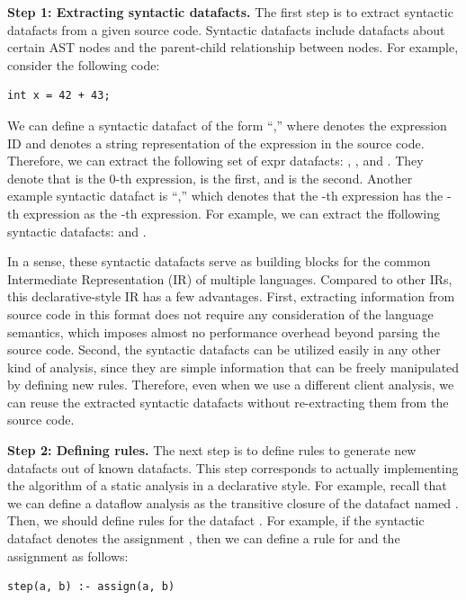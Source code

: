 \medskip
\textbf{Step 1: Extracting syntactic datafacts.}
The first step is to extract syntactic datafacts from a given source code.
Syntactic datafacts include datafacts about certain AST nodes and
the parent-child relationship between nodes. For example, consider
the following code:

\begin{lstlisting}[style=cpp,xleftmargin=2.5em]
int x = 42 + 43;
\end{lstlisting}
We can define a syntactic datafact of the form ``,''
where  denotes the expression ID and 
denotes a string representation of the expression in the source code.
Therefore, we can extract the following set of expr datafacts:
, , and .
They denote that  is the 0-th expression,
 is the first, and  is the second.
Another example syntactic datafact is ``,''
which denotes that the -th expression has the -th
expression as the -th expression.
For example, we can extract the ffollowing syntactic datafacts:
 and .

In a sense, these syntactic datafacts serve as building blocks for the
common Intermediate Representation (IR) of multiple languages.
Compared to other IRs, this declarative-style IR has a few advantages.
First, extracting information from source code in this format does not
require any consideration of the language semantics, which imposes
almost no performance overhead beyond parsing the source code.
Second, the syntactic datafacts can be utilized easily in any other kind of
analysis, since they are simple information that can be freely
manipulated by defining new rules. Therefore, even when we use a different
client analysis, we can reuse the extracted syntactic datafacts
without re-extracting them from the source code.


\medskip
\textbf{Step 2: Defining rules.}
The next step is to define rules to generate new datafacts out of known datafacts.
This step corresponds to actually implementing the algorithm of a
static analysis in a declarative style.
For example, recall that we can define a dataflow analysis
 as the transitive closure of the datafact
named .
Then, we should define rules for the datafact .
For example, if the syntactic datafact 
denotes the assignment , then we can define a rule for
 and the assignment as follows:
\begin{lstlisting}[style=myDatalog,xleftmargin=2.5em]
step(a, b) :- assign(a, b)
\end{lstlisting}


